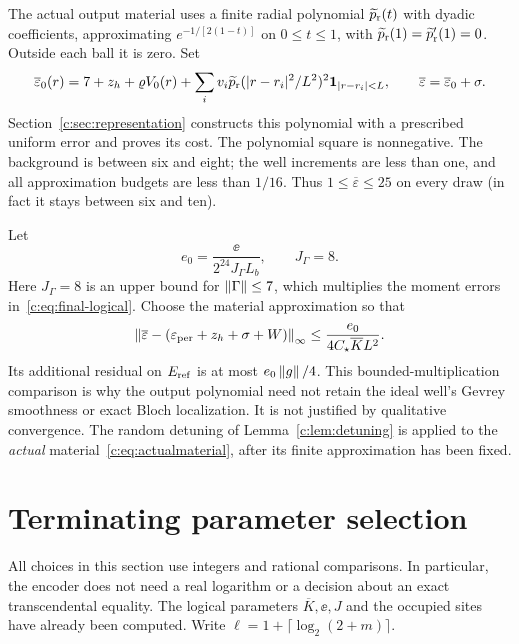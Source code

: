 The actual output material uses a finite radial polynomial $\widetilde p_{\rm r}(t)$
with dyadic coefficients, approximating $e^{-1/[2(1-t)]}$ on
$0\le t\le1$, with $\widetilde p_{\rm r}(1)=\widetilde p_{\rm r}'(1)=0$. Outside each ball it is zero.
Set
\begin{equation}
 \overline\varepsilon_0(r)=7+z_h+\varrho V_0(r)
       +\sum_i v_i \widetilde p_{\rm r}(|r-r_i|^2/L^2)^2\mathbf 1_{|r-r_i|<L},
 \qquad \overline\varepsilon=\overline\varepsilon_0+\sigma.
                                                               \label{c:eq:actualmaterial}
\end{equation}
Section~\ref{c:sec:representation} constructs this polynomial with a
prescribed uniform error and proves its cost. The polynomial square is
nonnegative. The background is between six and eight; the well
increments are less than one, and all approximation budgets are less
than $1/16$. Thus $1\le\overline\varepsilon\le25$ on every draw
(in fact it stays between six and ten).

Let
\begin{equation}
 e_0=\frac{\ee}{2^{24}J_\Gamma L_b},\qquad J_\Gamma=8.
                                                               \label{c:eq:e0}
\end{equation}
Here $J_\Gamma=8$ is an upper bound for $\left\lVert \Gamma\right\rVert\le7$, which
multiplies the moment errors in~\eqref{c:eq:final-logical}.
Choose the material approximation so that
\begin{equation}
 \left\lVert \overline\varepsilon-
          (\varepsilon_{\rm per}+z_h+\sigma+W)\right\rVert_\infty
       \le\frac{e_0}{4C_\star \overline KL^2}.                    \label{c:eq:materialprecision}
\end{equation}
Its additional residual on $E_{\rm ref}$ is at most $e_0\left\lVert g\right\rVert/4$.
This bounded-multiplication comparison is why the output polynomial
need not retain the ideal well's Gevrey smoothness or exact Bloch
localization. It is not justified by qualitative convergence.
The random detuning of Lemma~\ref{c:lem:detuning} is applied to the
\emph{actual} material~\eqref{c:eq:actualmaterial}, after its finite
approximation has been fixed.

\section{Terminating parameter selection}
\label{c:sec:parameters}

All choices in this section use integers and rational comparisons. In
particular, the encoder does not need a real logarithm or a decision
about an exact transcendental equality. The logical parameters
$\overline K,\ee,J$ and the occupied sites have already been computed.
Write $\ell=1+\lceil\log_2(2+m)\rceil$.

